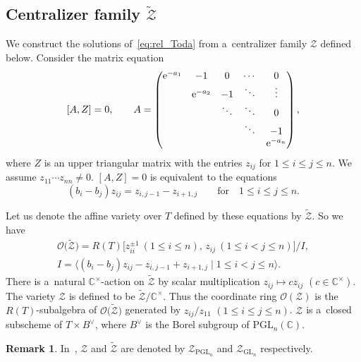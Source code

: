 \documentclass[pdftex]{sigma}
\numberwithin{equation}{section}
\newcommand{\C}{\mathbb{C}}
\newcommand{\GL}{\mathrm{GL}}
\newcommand{\PGL}{\mathrm{PGL}}
\newcommand{\Rep}{{R(T)}}
\theoremstyle{definition}
\newtheorem{Remark}[Theorem]{Remark}
\begin{document}
\subsection[Centralizer family Z]{Centralizer family $\boldsymbol{\tilde{\mathscr{Z}}}$}
\label{ssec:tZ}
We construct the solutions of~\eqref{eq:rel_Toda} from a~centralizer family $\mathscr{Z}$ defined below.
Consider the matrix equation
\begin{equation}
\label{eq:def-cent}
[A,Z]=0, \qquad
A=\begin{pmatrix}
{\rm e}^{-a_1} & -1 & 0 & \cdots &0\\
 & {\rm e}^{-a_2} & -1 & \ddots &\vdots\\
 & & \ddots & \ddots & 0\\
 & & &\ddots & -1\\
 & & & & {\rm e}^{-a_n}
\end{pmatrix},
\end{equation}
where $Z$ is an upper triangular
matrix with the entries $z_{ij}$ for $1\le i\le j\le n$. We assume $z_{11}\cdots z_{nn}\ne 0$.
$[A,Z]=0$ is equivalent to the equations
\begin{equation}
(b_i-b_j){z}_{ij}={{z}_{i,j-1}-{z}_{i+1,j}}\qquad \text{for} \quad1\le i\le j\le n. \label{eq:cent}
\end{equation}

Let us denote the affine variety over $T$ defined by these equations by $\tilde{\mathscr{Z}}$. So we have
\begin{gather*}
\mathscr{O}\bigl(\tilde{\mathscr{Z}}\bigr)=
\Rep\big[z_{ii}^{\pm 1} \ (1\le i\le n),\,
z_{ij} \ (1\le i< j\le n)
\big]/I,\\
I=\langle
(b_i-b_j)z_{ij}-z_{i,j-1}+z_{i+1,j}
\mid 1\le i< j\le n
\rangle.
\end{gather*}
There is a~natural
$\C^\times$-action
on $\tilde{\mathscr{Z}}$ by scalar
multiplication $z_{ij}\mapsto
cz_{ij}$ $(c\in \C^\times)$.
The variety $\mathscr{Z}$ is defined to be
$\tilde{\mathscr{Z}}/\C^\times$.
Thus the coordinate ring
$\mathscr{O}({\mathscr{Z}})$
is the $\Rep$-subalgebra of $\mathscr{O}\bigl(\tilde{\mathscr{Z}}\bigr)$ generated by
$z_{ij}/z_{11}$
$(1\le i\le j\le n)$.
$\mathscr{Z}$ is a~closed subscheme of
$T\times B^\vee$, where
$B^\vee$ is the
Borel subgroup of $\PGL_n(\C)$.


\begin{Remark}
In~\cite{ISY},
$\mathscr{Z}$ and
$\tilde{\mathscr{Z}}$
are denoted by $\mathscr{Z}_{\PGL_n}$
and $\mathscr{Z}_{\GL_n}$
respectively.
\end{Remark}
\end{document}
